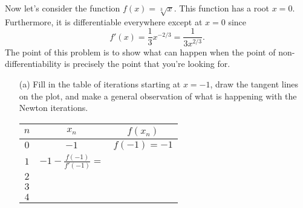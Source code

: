 \begin{problem}
    Now let's consider the function $f(x) = \sqrt[3]{x}$.  This function has a root $x=0$.
    Furthermore, it is differentiable everywhere except at $x=0$ since 
    \[ f'(x) = \frac{1}{3} x^{-2/3} = \frac{1}{3x^{2/3}}. \]
    The point of this problem is to show what can happen when the point of
    non-differentiability is precisely the point that you're looking for.  
    
    \begin{enumerate}
        \item[(a)] Fill in the
    table of iterations starting at $x=-1$, draw the tangent lines on the plot, and make a
    general observation of what is happening with the Newton iterations.

    \begin{minipage}{0.5\columnwidth}
        \begin{center}
            \begin{tabular}{|c|c|c|}
                \hline
                $n$ & $x_n$ & $f(x_n)$ \\ \hline \hline
                $0$ & $-1$   & $f(-1) = -1$ \\ \hline
                $1$ & $-1 - \frac{f(-1)}{f'(-1)} = $ &  \\ \hline
                $2$ &  & \\\hline
                $3$ & & \\\hline
                $4$ & & \\\hline
            \end{tabular}
        \end{center}
    \end{minipage}
    \begin{minipage}{0.5\columnwidth}
        \begin{center}
        \end{center}
    \end{minipage}


\end{enumerate}
\end{problem}
